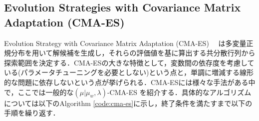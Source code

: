 \documentclass[a4j,11pt]{jarticle}
\begin{document}
\subsection{Evolution Strategies with Covariance Matrix Adaptation (CMA-ES)}
\label{ss:cma-es}

Evolution Strategy with Covariance Matrix Adaptation (CMA-ES)　\cite{mu-CMA-ES}\cite{CMA-ES} は多変量正規分布を用いて解候補を生成し，それらの評価値を基に算出する共分散行列から探索範囲を決定する．CMA-ESの大きな特徴として，変数間の依存度を考慮している(パラメータチューニングを必要としない)という点と，単調に増減する線形的な問題に依存しないという点が挙げられる．CMA-ESには様々な手法がある中で，ここでは一般的な$(\mu|\mu_w,\lambda)$-CMA-ES \cite{CMA-ES} を紹介する．具体的なアルゴリズムについては以下のAlgorithm \ref{code:cma-es}に示し，終了条件を満たすまで以下の手順を繰り返す．
\end{document}
